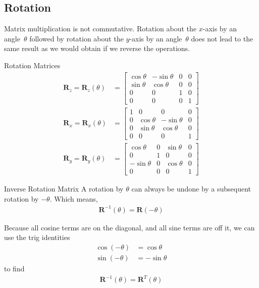 \documentclass[../COS3712_Notes.tex]{subfiles}
\begin{document}
      \subsection{Rotation}
        Matrix multiplication is not commutative.
        Rotation about the $x$-axis by an angle~$\theta$ followed by rotation about the $y$-axis
        by an angle~$\theta$ does not lead to the same result as we would obtain if we reverse
        the operations.

        \begin{theorem}{Rotation Matrices}
          \begin{align*}
            \mathbf{R}_z = \mathbf{R}_z(\theta) &= \begin{bmatrix}
              \cos\theta & -\sin\theta & 0 & 0 \\
              \sin\theta & \cos\theta & 0 & 0 \\
              0 & 0 & 1 & 0 \\
              0 & 0 & 0 & 1
            \end{bmatrix}\\
            \mathbf{R}_x = \mathbf{R}_x(\theta) &= \begin{bmatrix}
              1 & 0 & 0 & 0 \\
              0 & \cos\theta & -\sin\theta & 0 \\
              0 & \sin\theta & \cos\theta & 0 \\
              0 & 0 & 0 & 1
            \end{bmatrix}\\
            \mathbf{R}_y = \mathbf{R}_y(\theta) &= \begin{bmatrix}
              \cos\theta & 0 & \sin\theta & 0\\
              0 & 1 & 0 & 0\\
              -\sin\theta & 0 & \cos\theta & 0\\
              0 & 0 & 0 & 1
            \end{bmatrix}
          \end{align*}
        \end{theorem}

        \begin{theorem}{Inverse Rotation Matrix}
          A rotation by $\theta$ can always be undone by a subsequent rotation by $-\theta$.
          Which means,
          \begin{align*}
            \mathbf{R}^{-1}(\theta) = \mathbf{R}(-\theta)
          \end{align*}

          Because all cosine terms are on the diagonal, and all sine terms are off it,
          we can use the trig identities
          \begin{align*}
            \cos(-\theta) &= \cos\theta\\
            \sin(-\theta) &= -\sin\theta
          \end{align*}
          to find
          \begin{align*}
            \mathbf{R}^{-1}(\theta) = \mathbf{R}^{T}(\theta)
          \end{align*}
        \end{theorem}
\end{document}
